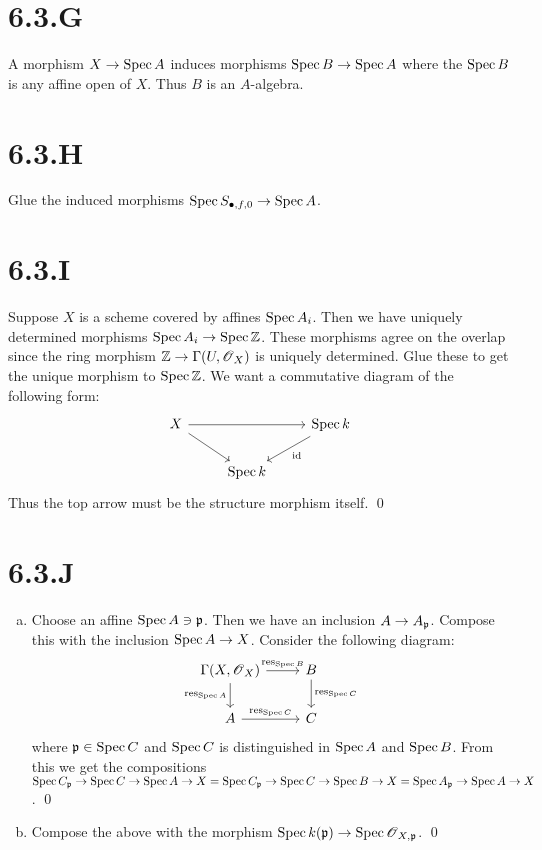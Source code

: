 \documentclass{article}
\begin{document}
\section{6.3.G}
A morphism $X \to \operatorname{Spec} A$ induces morphisms $\operatorname{Spec} B \to \operatorname{Spec} A$
where the $\operatorname{Spec} B$ is any affine open of $X$.
Thus $B$ is an $A$-algebra.

\section{6.3.H}
Glue the induced morphisms $\operatorname{Spec} S_{\bullet, f, 0} \to \operatorname{Spec} A$.

\section{6.3.I}
Suppose $X$ is a scheme covered by affines
$\operatorname{Spec} A_i$. Then we have uniquely determined morphisms
$\operatorname{Spec} A_i \to \operatorname{Spec} \mathbb{Z}$. These morphisms agree on the overlap since the ring
morphism $\mathbb{Z} \to \Gamma(U, \operatorname{\mathscr{O}}_X)$ is uniquely determined. Glue these to get the
unique morphism to $\operatorname{Spec} \mathbb{Z}$. We want a commutative diagram of
the following form: \[
    \begin{tikzcd}
        X \ar[rr] \ar[dr] &         & \Spec k \ar[dl, "\text{id}"] \\
                          & \Spec k
    \end{tikzcd}
\] Thus the top arrow must be the
structure morphism itself. \qed

\section{6.3.J}
\begin{enumerate}[a.]
    \item Choose an affine $\operatorname{Spec} A \ni \mathfrak{p}$. Then we have an inclusion
          $A \to A_{\mathfrak{p}}$. Compose this with the inclusion $\operatorname{Spec} A \to X$.
          Consider the following diagram: \[
              \begin{tikzcd}
                  \Gamma(X, \Osh_X) \ar[d, "\operatorname{res}_{\Spec A}", swap] \ar[r, "\operatorname{res}_{\Spec B}"] & B\ar[d, "\operatorname{res}_{\Spec C}"] \\
                  A \ar[r, "\operatorname{res}_{\Spec C}"]                                                              & C
              \end{tikzcd}
          \] where
          $\mathfrak{p} \in \operatorname{Spec} C$ and $\operatorname{Spec} C$ is distinguished in
          $\operatorname{Spec} A$ and $\operatorname{Spec} B$. From this we get the
          compositions $\operatorname{Spec} C_{\mathfrak{p}} \to \operatorname{Spec} C \to \operatorname{Spec} A \to X = \operatorname{Spec}
              C_{\mathfrak{p}} \to \operatorname{Spec} C \to \operatorname{Spec} B \to X = \operatorname{Spec}
              A_{\mathfrak{p}} \to \operatorname{Spec} A \to X$. \qed
    \item Compose the above with the morphism $\operatorname{Spec} k(\mathfrak{p}) \to \operatorname{Spec} \operatorname{\mathscr{O}}_{X, \mathfrak{p}}$. \qed
\end{enumerate}
\end{document}
